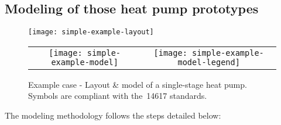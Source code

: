 \subsection{Modeling of those heat pump prototypes}
\label{sec:methodo-models}

\begin{figure}
  \centering
  \texttt{[image: simple-example-layout]}
  \begin{tabular}[h]{cc}
    \texttt{[image: simple-example-model]} &
    \texttt{[image: simple-example-model-legend]}\\
  \end{tabular}
  \caption[Example case -- Layout \& model]{Example case - Layout \&
    model of a single-stage heat pump. Symbols are compliant with the
    \cite{ISO14617}\,14617 standards.}
  \label{fig:simple-example-layout+model}
\end{figure}

The modeling methodology follows the steps detailed below:

